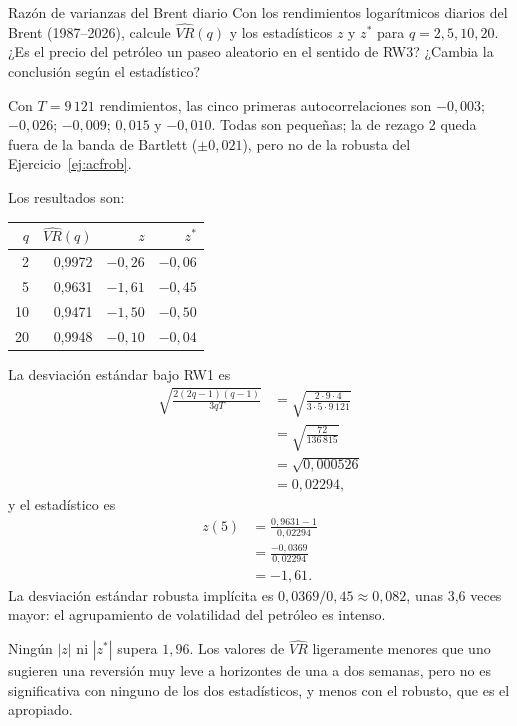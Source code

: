 \begin{ejresuelto}{Razón de varianzas del Brent diario}\label{ej:vrbrent}
\enunciado Con los rendimientos logarítmicos diarios del Brent (1987--2026), calcule $\widehat{VR}(q)$ y los
estadísticos $z$ y $z^*$ para $q=2,5,10,20$. ¿Es el precio del petróleo un paseo aleatorio en el sentido de
RW3? ¿Cambia la conclusión según el estadístico?

\solucion
{} Con $T=9\,121$ rendimientos, las cinco primeras autocorrelaciones son
$-0{,}003$; $-0{,}026$; $-0{,}009$; $0{,}015$ y $-0{,}010$. Todas son pequeñas; la de rezago 2 queda fuera de la
banda de Bartlett ($\pm0{,}021$), pero no de la robusta del Ejercicio~\ref{ej:acfrob}.

 Los resultados son:
\begin{center}\small
\begin{tabular}{@{}rrrr@{}}
\toprule
$q$ & $\widehat{VR}(q)$ & $z$ & $z^*$ \\
\midrule
2  & 0,9972 & $-0{,}26$ & $-0{,}06$ \\
5  & 0,9631 & $-1{,}61$ & $-0{,}45$ \\
10 & 0,9471 & $-1{,}50$ & $-0{,}50$ \\
20 & 0,9948 & $-0{,}10$ & $-0{,}04$ \\
\bottomrule
\end{tabular}
\end{center}

 La desviación estándar bajo RW1 es
\begin{align*}
  \sqrt{\frac{2(2q-1)(q-1)}{3qT}}
    &= \sqrt{\frac{2\cdot9\cdot4}{3\cdot5\cdot9\,121}}\\
    &= \sqrt{\frac{72}{136\,815}}\\
    &= \sqrt{0{,}000526}\\
    &= 0{,}02294,
\end{align*}
y el estadístico es
\begin{align*}
  z(5) &= \frac{0{,}9631-1}{0{,}02294}\\
       &= \frac{-0{,}0369}{0{,}02294}\\
       &= -1{,}61 .
\end{align*}
La desviación estándar robusta implícita es $0{,}0369/0{,}45\approx0{,}082$, unas 3,6 veces mayor: el
agrupamiento de volatilidad del petróleo es intenso.

 Ningún $|z|$ ni $|z^*|$ supera $1{,}96$. Los valores de $\widehat{VR}$
ligeramente menores que uno sugieren una reversión muy leve a horizontes de una a dos semanas, pero no es
significativa con ninguno de los dos estadísticos, y menos con el robusto, que es el apropiado.


\end{ejresuelto}
